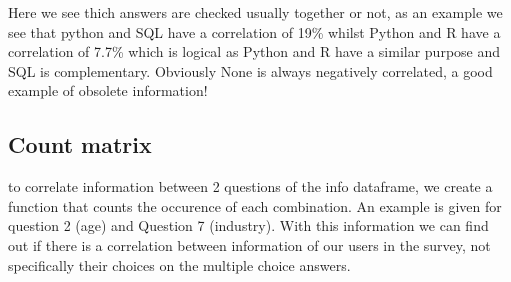 \documentclass[letterpaper,10pt,english]{jupyterBook}
\begin{document}
\sphinxAtStartPar
Here we see thich answers are checked usually together or not, as an example we see that python and SQL have a correlation of 19\% whilst Python and R have a correlation of 7.7\% which is logical as Python and R have a similar purpose and SQL is complementary. Obviously None is always negatively correlated, a good example of obsolete information!


\subsection{Count matrix}
\label{\detokenize{c7_case_studies/UserSurvey:count-matrix}}
\sphinxAtStartPar
to correlate information between 2 questions of the info dataframe, we create a function that counts the occurence of each combination. An example is given for question 2 (age) and Question 7 (industry). With this information we can find out if there is a correlation between information of our users in the survey, not specifically their choices on the multiple choice answers.

\begin{sphinxVerbatim}[commandchars=\\\{\}]
  
   \PYG{p}{[}\PYG{p}{[}\PYG{p}{[}\PYG{p}{]} \PYG{p}{[}\PYG{p}{]}\PYG{p}{]}\PYG{p}{]}\PYG{p}{[}\PYG{p}{[}\PYG{p}{]} \PYG{p}{[}\PYG{p}{]}\PYG{p}{]}
\end{sphinxVerbatim}

\begin{sphinxVerbatim}[commandchars=\\\{\}]
 
\end{sphinxVerbatim}
\end{document}
